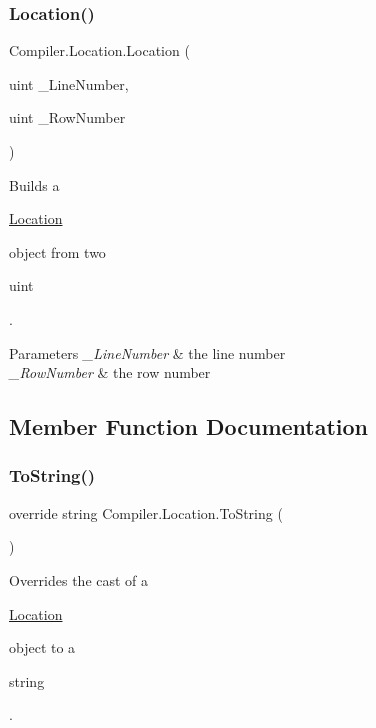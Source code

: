 \subsubsection{\texorpdfstring{Location()}{Location()}}
{\footnotesize\ttfamily Compiler.\+Location.\+Location (\begin{DoxyParamCaption}\item[{uint}]{\+\_\+\+Line\+Number,  }\item[{uint}]{\+\_\+\+Row\+Number }\end{DoxyParamCaption})}

Builds a
\begin{DoxyCode}
\mbox{\hyperlink{class_compiler_1_1_location_a389e64f3314c314948b740af8de9dcea}{Location}} 
\end{DoxyCode}
 object from two
\begin{DoxyCode}
uint 
\end{DoxyCode}
 . 
\begin{DoxyParams}{Parameters}
{\em \+\_\+\+Line\+Number} & the line number \\
\hline
{\em \+\_\+\+Row\+Number} & the row number \\
\hline
\end{DoxyParams}


\subsection{Member Function Documentation}
\mbox{\label{class_compiler_1_1_location_a44ca3fe0ddbc48974f1f85fc6df0ba90}} 
\subsubsection{\texorpdfstring{To\+String()}{ToString()}}
{\footnotesize\ttfamily override string Compiler.\+Location.\+To\+String (\begin{DoxyParamCaption}{ }\end{DoxyParamCaption})}

Overrides the cast of a
\begin{DoxyCode}
\mbox{\hyperlink{class_compiler_1_1_location_a389e64f3314c314948b740af8de9dcea}{Location}} 
\end{DoxyCode}
 object to a
\begin{DoxyCode}
\textcolor{keywordtype}{string} 
\end{DoxyCode}
 . 

